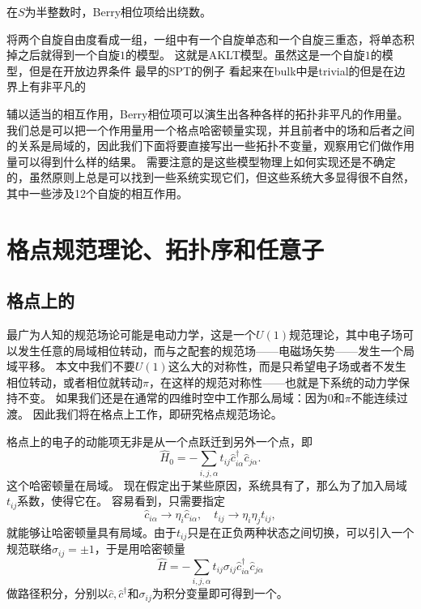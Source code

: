 \documentclass[hyperref, UTF8, a4paper]{ctexart}
\newcommand*{\concept}[1]{\underline{\textbf{#1}}}
\newcommand*{\Ztwo}{$\mathbb{Z}_2$}
\begin{document}
在$S$为半整数时，Berry相位项给出绕数。

将两个自旋自由度看成一组，一组中有一个自旋单态和一个自旋三重态，将单态积掉之后就得到一个自旋$1$的模型。
这就是AKLT模型。虽然这是一个自旋$1$的模型，但是在开放边界条件
最早的SPT的例子
看起来在bulk中是trivial的但是在边界上有非平凡的

辅以适当的相互作用，Berry相位项可以演生出各种各样的拓扑非平凡的作用量。我们总是可以把一个作用量用一个格点哈密顿量实现，并且前者中的场和后者之间的关系是局域的，因此我们下面将要直接写出一些拓扑不变量，观察用它们做作用量可以得到什么样的结果。
需要注意的是这些模型物理上如何实现还是不确定的，虽然原则上总是可以找到一些系统实现它们，但这些系统大多显得很不自然，其中一些涉及12个自旋的相互作用。

\section{格点规范理论、拓扑序和任意子}

\subsection{格点上的}\label{sec:z2-on-lattice}

最广为人知的规范场论可能是电动力学，这是一个$U(1)$规范理论，其中电子场可以发生任意的局域相位转动，而与之配套的规范场——电磁场矢势——发生一个局域平移。
本文中我们不要$U(1)$这么大的对称性，而是只希望电子场或者不发生相位转动，或者相位就转动$\pi$，在这样的规范对称性——也就是\concept{}下系统的动力学保持不变。
如果我们还是在通常的四维时空中工作那么局域：因为$0$和$\pi$不能连续过渡。
因此我们将在格点上工作，即研究格点规范场论。

格点上的电子的动能项无非是从一个点跃迁到另外一个点，即
\begin{equation}
    \hat{H}_0 = - \sum_{i, j, \alpha} t_{ij} \hat{c}_{i \alpha}^\dagger \hat{c}_{j \alpha}.
    \label{eq:hopping-hamiltonian}
\end{equation}
这个哈密顿量在局域。
现在假定出于某些原因，系统具有了，那么为了加入局域$t_{ij}$系数，使得它在。
容易看到，只需要指定
\[
    \hat{c}_{i \alpha} \longrightarrow \eta_{i} \hat{c}_{i \alpha}, \quad t_{ij} \longrightarrow \eta_i \eta_j t_{ij},
\]
就能够让哈密顿量具有局域。由于$t_{ij}$只是在正负两种状态之间切换，可以引入一个规范联络$\sigma_{ij} = \pm 1$，于是用哈密顿量
\[
    \hat{H} = - \sum_{i, j, \alpha} t_{ij} \sigma_{ij} \hat{c}_{i \alpha}^\dagger \hat{c}_{j \alpha}
\]
做路径积分，分别以$\hat{c}, \hat{c}^\dagger$和$\sigma_{ij}$为积分变量即可得到一个。
\end{document}
